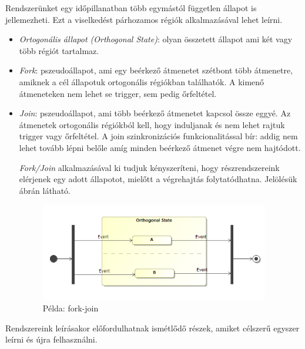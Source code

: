 Rendszerünket egy időpillanatban több egymástól független állapot is jellemezheti. Ezt a viselkedést párhozamos régiók alkalmazásával lehet leírni.
\begin{itemize}
	\item \emph{Ortogonális állapot (Orthogonal State)}: olyan összetett állapot ami két vagy több régiót tartalmaz.
	\item \emph{Fork}: pszeudoállapot, ami egy beérkező átmenetet szétbont több átmenetre, amiknek a cél állapotuk ortogonális régiókban találhatók. A kimenő átmeneteken nem lehet se trigger, sem pedig őrfeltétel.
	\item \emph{Join}: pszeudoállapot, ami több beérkező átmenetet kapcsol össze eggyé. Az átmenetek ortogonális régiókból kell, hogy induljanak és nem lehet rajtuk trigger vagy őrfeltétel. A join szinkronizációs funkcionalitással bír: addig nem lehet tovább lépni belőle amíg minden beérkező átmenet végre nem hajtódott.
	
	\emph{Fork/Join} alkalmazásával ki tudjuk kényszeríteni, hogy részrendszereink elérjenek egy adott állapotot, mielőtt a végrehajtás folytatódhatna. Jelölésük  ábrán látható. 
	
	\begin{figure}[!ht]
		\centering
		\includegraphics[keepaspectratio, width=100mm]{figures/statechart_elements/forkjoin.png}
		\caption{Példa: fork-join}
		\label{fig:forkjoin}
	\end{figure}
	
\end{itemize}
Rendszereink leírásakor előfordulhatnak ismétlődő részek, amiket célszerű egyszer leírni és újra felhasználni.
